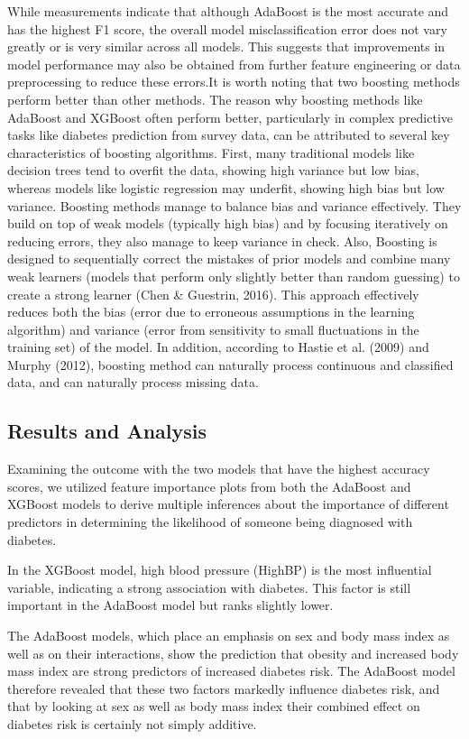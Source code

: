 \documentclass[12pt]{article}
\begin{document}
While measurements indicate that although AdaBoost is the most accurate and has the highest F1 score, the overall model misclassification error does not vary greatly or is very similar across all models. This suggests that improvements in model performance may also be obtained from further feature engineering or data preprocessing to reduce these errors.It is worth noting that two boosting methods perform better than other methods. The reason why boosting methods like AdaBoost and XGBoost often perform better, particularly in complex predictive tasks like diabetes prediction from survey data, can be attributed to several key characteristics of boosting algorithms. First, many traditional models like decision trees tend to overfit the data, showing high variance but low bias, whereas models like logistic regression may underfit, showing high bias but low variance. Boosting methods manage to balance bias and variance effectively. They build on top of weak models (typically high bias) and by focusing iteratively on reducing errors, they also manage to keep variance in check. Also, Boosting is designed to sequentially correct the mistakes of prior models and combine many weak learners (models that perform only slightly better than random guessing) to create a strong learner (Chen \& Guestrin, 2016). This approach effectively reduces both the bias (error due to erroneous assumptions in the learning algorithm) and variance (error from sensitivity to small fluctuations in the training set) of the model. In addition, according to Hastie et al. (2009) and Murphy (2012), boosting method can naturally process continuous and classified data, and can naturally process missing data. 

\subsection{Results and Analysis}
Examining the outcome with the two models that have the highest accuracy scores, we utilized feature importance plots from both the AdaBoost and XGBoost models to derive multiple inferences about the importance of different predictors in determining the likelihood of someone being diagnosed with diabetes.

In the XGBoost model, high blood pressure (HighBP) is the most influential variable,
indicating a strong association with diabetes. This factor is still important in the AdaBoost model but ranks slightly lower. 

The AdaBoost models, which place an emphasis on sex and body mass index as well as on their interactions, show the prediction that obesity and increased body mass index are strong predictors of increased diabetes risk. The AdaBoost model therefore revealed that these two factors markedly influence diabetes risk, and that by looking at sex as well as body mass index their combined effect on diabetes risk is certainly not simply additive.
\end{document}
